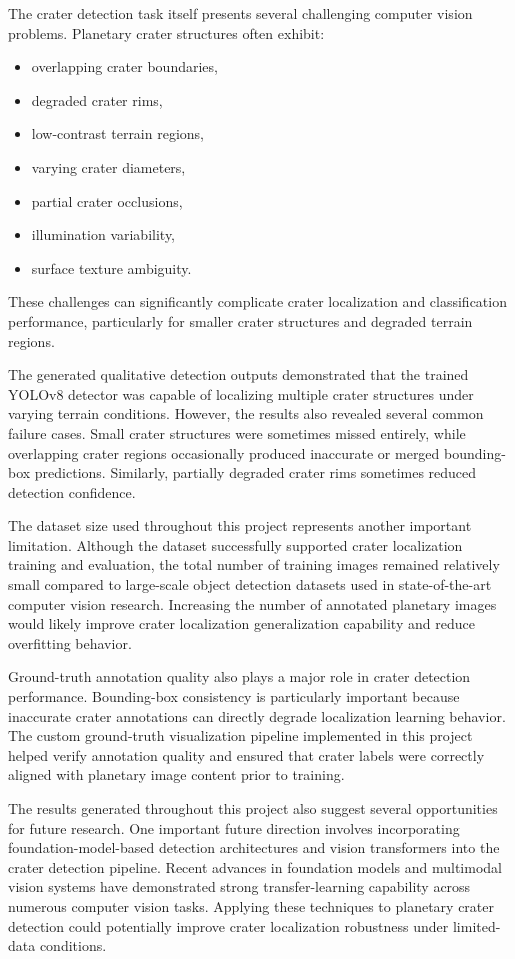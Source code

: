 \documentclass[conference]{IEEEtran}
\begin{document}
	The crater detection task itself presents several challenging computer vision problems. Planetary crater structures often exhibit:
	\begin{itemize}
		\item overlapping crater boundaries,
		\item degraded crater rims,
		\item low-contrast terrain regions,
		\item varying crater diameters,
		\item partial crater occlusions,
		\item illumination variability,
		\item surface texture ambiguity.
	\end{itemize}
	
	These challenges can significantly complicate crater localization and classification performance, particularly for smaller crater structures and degraded terrain regions.
	
	The generated qualitative detection outputs demonstrated that the trained YOLOv8 detector was capable of localizing multiple crater structures under varying terrain conditions. However, the results also revealed several common failure cases. Small crater structures were sometimes missed entirely, while overlapping crater regions occasionally produced inaccurate or merged bounding-box predictions. Similarly, partially degraded crater rims sometimes reduced detection confidence.
	
	The dataset size used throughout this project represents another important limitation. Although the dataset successfully supported crater localization training and evaluation, the total number of training images remained relatively small compared to large-scale object detection datasets used in state-of-the-art computer vision research. Increasing the number of annotated planetary images would likely improve crater localization generalization capability and reduce overfitting behavior.
	
	Ground-truth annotation quality also plays a major role in crater detection performance. Bounding-box consistency is particularly important because inaccurate crater annotations can directly degrade localization learning behavior. The custom ground-truth visualization pipeline implemented in this project helped verify annotation quality and ensured that crater labels were correctly aligned with planetary image content prior to training.
	
	The results generated throughout this project also suggest several opportunities for future research. One important future direction involves incorporating foundation-model-based detection architectures and vision transformers into the crater detection pipeline. Recent advances in foundation models and multimodal vision systems have demonstrated strong transfer-learning capability across numerous computer vision tasks. Applying these techniques to planetary crater detection could potentially improve crater localization robustness under limited-data conditions.
	
\end{document}
